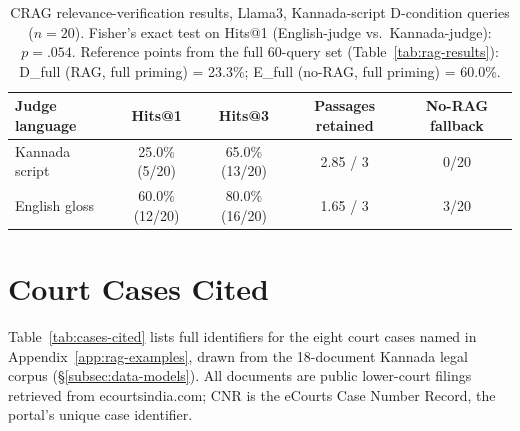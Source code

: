 \documentclass[11pt]{article}
\begin{document}
\begin{table}[t]
\centering
\small
\begin{tabular}{lcccc}
\hline
\textbf{Judge language} & \textbf{Hits@1} & \textbf{Hits@3} & \textbf{Passages retained} & \textbf{No-RAG fallback} \\
\hline
Kannada script   & 25.0\% (5/20)  & 65.0\% (13/20) & 2.85 / 3 & 0/20 \\
English gloss    & 60.0\% (12/20) & 80.0\% (16/20) & 1.65 / 3 & 3/20 \\
\hline
\end{tabular}
\caption{CRAG relevance-verification results, Llama3, Kannada-script D-condition queries ($n=20$). Fisher's exact test on Hits@1 (English-judge vs.\ Kannada-judge): $p = .054$. Reference points from the full 60-query set (Table~\ref{tab:rag-results}): D\_full (RAG, full priming) = 23.3\%; E\_full (no-RAG, full priming) = 60.0\%.}
\label{tab:crag}
\end{table}

\section{Court Cases Cited}
\label{app:cases}

Table~\ref{tab:cases-cited} lists full identifiers for the eight court
cases named in Appendix~\ref{app:rag-examples}, drawn from the
18-document Kannada legal corpus (\S\ref{subsec:data-models}). All documents are public
lower-court filings retrieved from 
ecourtsindia.com; CNR is the eCourts Case Number Record, the
portal's unique case identifier.
\end{document}
